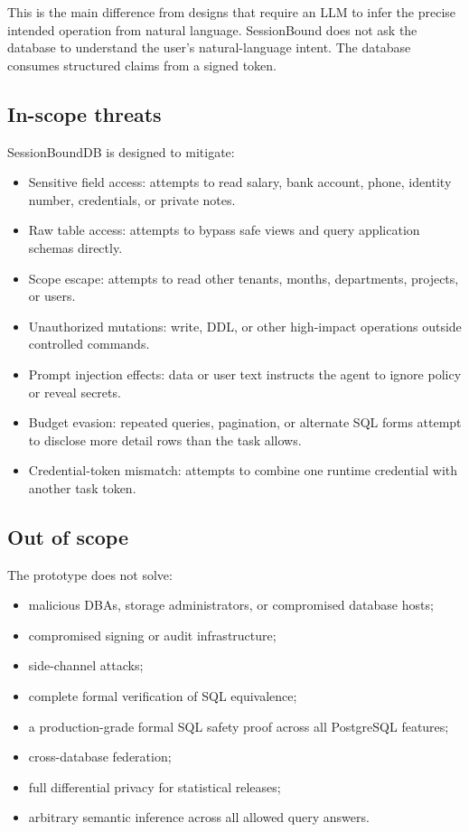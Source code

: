 \documentclass[journal]{IEEEtran}
\providecommand{\tightlist}{%
  \setlength{\itemsep}{0pt}\setlength{\parskip}{0pt}}
\begin{document}
This is the main difference from designs that require an LLM to infer
the precise intended operation from natural language. SessionBound does
not ask the database to understand the user's natural-language intent.
The database consumes structured claims from a signed token.

\hypertarget{in-scope-threats}{%
\subsection{In-scope threats}\label{in-scope-threats}}

SessionBoundDB is designed to mitigate:

\begin{itemize}
\tightlist
\item
  Sensitive field access: attempts to read salary, bank
  account, phone, identity number, credentials, or private notes.
\item
  Raw table access: attempts to bypass safe views and query
  application schemas directly.
\item
  Scope escape: attempts to read other tenants, months,
  departments, projects, or users.
\item
  Unauthorized mutations: write, DDL, or other high-impact operations
  outside controlled commands.
\item
  Prompt injection effects: data or user text instructs the
  agent to ignore policy or reveal secrets.
\item
  Budget evasion: repeated queries, pagination, or alternate
  SQL forms attempt to disclose more detail rows than the task allows.
\item
  Credential-token mismatch: attempts to combine one runtime
  credential with another task token.
\end{itemize}

\hypertarget{out-of-scope}{%
\subsection{Out of scope}\label{out-of-scope}}

The prototype does not solve:

\begin{itemize}
\tightlist
\item
  malicious DBAs, storage administrators, or compromised database hosts;
\item
  compromised signing or audit infrastructure;
\item
  side-channel attacks;
\item
  complete formal verification of SQL equivalence;
\item
  a production-grade formal SQL safety proof across all PostgreSQL
  features;
\item
  cross-database federation;
\item
  full differential privacy for statistical releases;
\item
  arbitrary semantic inference across all allowed query answers.
\end{itemize}
\end{document}

